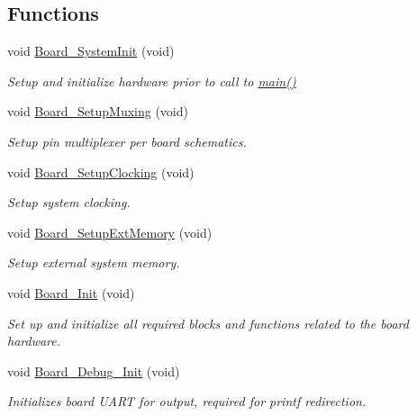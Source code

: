 \subsection*{Functions}
\begin{DoxyCompactItemize}
\item 
void \hyperlink{group___b_o_a_r_d___c_o_m_m_o_n___a_p_i_gaeb60ea85499a4208167ae2540086516a}{Board\+\_\+\+System\+Init} (void)
\begin{DoxyCompactList}\small\item\em Setup and initialize hardware prior to call to \hyperlink{group__samples_ga840291bc02cba5474a4cb46a9b9566fe}{main()} \end{DoxyCompactList}\item 
void \hyperlink{group___b_o_a_r_d___c_o_m_m_o_n___a_p_i_ga8ac1dc465c66e1cc00f5ffd346904d97}{Board\+\_\+\+Setup\+Muxing} (void)
\begin{DoxyCompactList}\small\item\em Setup pin multiplexer per board schematics. \end{DoxyCompactList}\item 
void \hyperlink{group___b_o_a_r_d___c_o_m_m_o_n___a_p_i_gae417dc93d00f1a89f74220e569fac777}{Board\+\_\+\+Setup\+Clocking} (void)
\begin{DoxyCompactList}\small\item\em Setup system clocking. \end{DoxyCompactList}\item 
void \hyperlink{group___b_o_a_r_d___c_o_m_m_o_n___a_p_i_ga27d97e44ce026a509b12317e059b2204}{Board\+\_\+\+Setup\+Ext\+Memory} (void)
\begin{DoxyCompactList}\small\item\em Setup external system memory. \end{DoxyCompactList}\item 
void \hyperlink{group___b_o_a_r_d___c_o_m_m_o_n___a_p_i_gae8d2d761b984f48c3dbb27dd32a8c119}{Board\+\_\+\+Init} (void)
\begin{DoxyCompactList}\small\item\em Set up and initialize all required blocks and functions related to the board hardware. \end{DoxyCompactList}\item 
void \hyperlink{group___b_o_a_r_d___c_o_m_m_o_n___a_p_i_gabcba073f50ad637ee6bc852f64ea2ce6}{Board\+\_\+\+Debug\+\_\+\+Init} (void)
\begin{DoxyCompactList}\small\item\em Initializes board U\+A\+RT for output, required for printf redirection. \end{DoxyCompactList}\item 

\end{DoxyCompactItemize}
